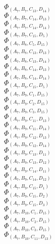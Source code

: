 \documentclass[14pt]{article}
\begin{document}
    $\Phi_{({A}_{7}, {B}_{7}, {C}_{13}, {D}_{14})}$ \\ 
    $\Phi_{({A}_{7}, {B}_{7}, {C}_{14}, {D}_{13})}$ \\ 
    $\Phi_{({A}_{7}, {B}_{7}, {C}_{14}, {D}_{14})}$ \\ 
    $\Phi_{({A}_{7}, {B}_{7}, {C}_{15}, {D}_{5})}$ \\ 
    $\Phi_{({A}_{7}, {B}_{8}, {C}_{5}, {D}_{15})}$ \\ 
    $\Phi_{({A}_{7}, {B}_{8}, {C}_{13}, {D}_{13})}$ \\ 
    $\Phi_{({A}_{7}, {B}_{8}, {C}_{13}, {D}_{14})}$ \\ 
    $\Phi_{({A}_{7}, {B}_{8}, {C}_{14}, {D}_{13})}$ \\ 
    $\Phi_{({A}_{7}, {B}_{8}, {C}_{14}, {D}_{14})}$ \\ 
    $\Phi_{({A}_{7}, {B}_{8}, {C}_{15}, {D}_{5})}$ \\ 
    $\Phi_{({A}_{7}, {B}_{9}, {C}_{1}, {D}_{15})}$ \\ 
    $\Phi_{({A}_{7}, {B}_{9}, {C}_{2}, {D}_{15})}$ \\ 
    $\Phi_{({A}_{7}, {B}_{9}, {C}_{3}, {D}_{15})}$ \\ 
    $\Phi_{({A}_{7}, {B}_{9}, {C}_{11}, {D}_{13})}$ \\ 
    $\Phi_{({A}_{7}, {B}_{9}, {C}_{11}, {D}_{14})}$ \\ 
    $\Phi_{({A}_{7}, {B}_{9}, {C}_{12}, {D}_{13})}$ \\ 
    $\Phi_{({A}_{7}, {B}_{9}, {C}_{12}, {D}_{14})}$ \\ 
    $\Phi_{({A}_{7}, {B}_{9}, {C}_{13}, {D}_{11})}$ \\ 
    $\Phi_{({A}_{7}, {B}_{9}, {C}_{13}, {D}_{12})}$ \\ 
    $\Phi_{({A}_{7}, {B}_{9}, {C}_{14}, {D}_{11})}$ \\ 
    $\Phi_{({A}_{7}, {B}_{9}, {C}_{14}, {D}_{12})}$ \\ 
    $\Phi_{({A}_{7}, {B}_{9}, {C}_{15}, {D}_{1})}$ \\ 
    $\Phi_{({A}_{7}, {B}_{9}, {C}_{15}, {D}_{2})}$ \\ 
    $\Phi_{({A}_{7}, {B}_{9}, {C}_{15}, {D}_{3})}$ \\ 
    $\Phi_{({A}_{7}, {B}_{10}, {C}_{1}, {D}_{15})}$ \\ 
    $\Phi_{({A}_{7}, {B}_{10}, {C}_{2}, {D}_{15})}$ \\ 
    $\Phi_{({A}_{7}, {B}_{10}, {C}_{3}, {D}_{15})}$ \\ 
    $\Phi_{({A}_{7}, {B}_{10}, {C}_{11}, {D}_{13})}$ \\ 
\end{document}
